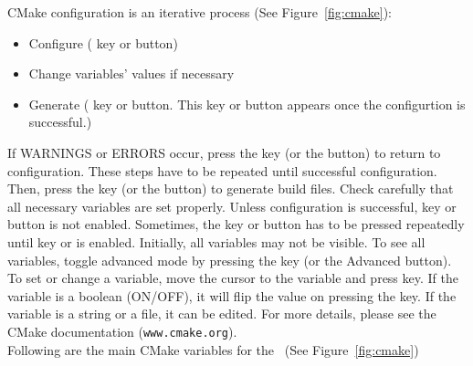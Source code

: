 CMake configuration is an iterative process (See Figure~\ref{fig:cmake}):
\begin{itemize}
\item Configure ( key or  button)
\item Change variables' values if necessary
\item Generate ( key or  button. This key or button appears once the configurtion is successful.)
\end{itemize}

If WARNINGS or ERRORS occur, press the  key (or the  button) to return to configuration. These steps have to be repeated until successful configuration. Then, press the  key (or the  button) to generate build files. Check carefully that all necessary variables are set properly. Unless configuration is successful,  key or  button is not enabled. Sometimes, the  key or  button has to be pressed repeatedly until  key or  is enabled. Initially, all variables may not be visible. To see all variables, toggle advanced mode by pressing the  key (or the Advanced button).
To set or change a variable, move the cursor to the variable and press  key. If the variable is a boolean (ON/OFF), it will flip the value on pressing the  key. If the variable is a string or a file, it can be edited. For more details, please see the CMake documentation (\texttt{www.cmake.org}).
\\

Following are the main CMake variables for the \pack\ (See Figure~\ref{fig:cmake})

